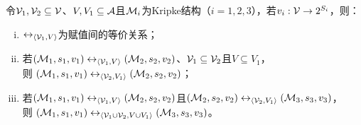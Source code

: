 \begin{proposition} \label{pro:EqUnion}
	令${\cal V}_1, {\cal V}_2\subseteq {\cal V}$、$V, V_1 \subseteq {\cal A}$且${\cal M}_i$为Kripke结构（$i=1,2,3$），若$v_i: {\cal V}\rightarrow 2^{S_i}$，则：
	\begin{enumerate} [(i)]
		\item $\leftrightarrow_{{\langle{{\cal V}_1,V}\rangle}}$为赋值间的等价关系；
		\item 若$({\cal M}_1, s_1,v_1) \leftrightarrow_{{\langle{{\cal V}_1,V}\rangle}} ({\cal M}_2,s_2,v_2)$、${\cal V}_1 \subseteq {\cal V}_2$且$V \subseteq V_1$，\\
		则 $({\cal M}_1, s_1, v_1) \leftrightarrow_{{\langle{{\cal V}_2,V_1}\rangle}} ({\cal M}_2, s_2, v_2)$；
		\item 若$({\cal M}_1, s_1, v_1) \leftrightarrow_{{\langle{{\cal V}_1,V}\rangle}} ({\cal M}_2,s_2, v_2)$且$({\cal M}_2,s_2, v_2) \leftrightarrow_{{\langle{{\cal V}_2,V_1}\rangle}} ({\cal M}_3,s_3, v_3)$，\\
		则 $({\cal M}_1,s_1,v_1) \leftrightarrow_{{\langle{{\cal V}_1 \cup {\cal V}_2, V \cup V_1}\rangle}} ({\cal M}_3,s_3,v_3)$。
	\end{enumerate}
%	
\end{proposition}
